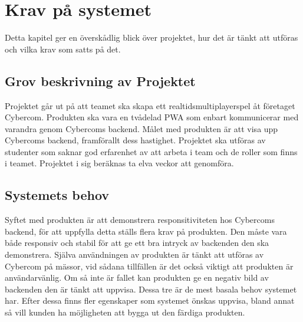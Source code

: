 \documentclass[10pt]{article}
\begin{document}
		
\pagebreak
\section{Krav på systemet}
	Detta kapitel ger en överskådlig blick över projektet, hur det är tänkt att utföras och vilka krav som satts på det.

	\subsection{Grov beskrivning av Projektet}
	Projektet går ut på att teamet ska skapa ett realtidsmultiplayerspel åt företaget Cybercom. Produkten ska vara en tvådelad PWA som enbart kommunicerar med varandra genom Cybercoms backend. Målet med produkten är att visa upp Cybercoms backend, framförallt dess hastighet.
	Projektet ska utföras av studenter som saknar god erfarenhet av att arbeta i team och de roller som finns i teamet. Projektet i sig beräknas ta elva veckor att genomföra. 
	
	\subsection{Systemets behov}
	Syftet med produkten är att demonstrera responsitiviteten hos Cybercoms backend, för att uppfylla detta ställs flera krav på produkten. Den måste vara både responsiv och stabil för att ge ett bra intryck av backenden den ska demonstrera. Själva användningen av produkten är tänkt att utföras av Cybercom på mässor, vid sådana tillfällen är det också viktigt att produkten är användarvänlig. Om så inte är fallet kan produkten ge en negativ bild av backenden den är tänkt att uppvisa. Dessa tre är de mest basala behov systemet har. Efter dessa finns fler egenskaper som systemet önskas uppvisa, bland annat så vill kunden ha möjligheten att bygga ut den färdiga produkten.
	
	
\end{document}
